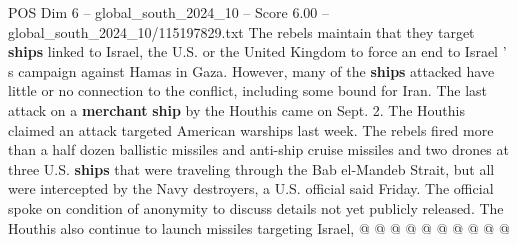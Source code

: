 \begin{textsample}{POS Dim 6 – global\_south\_2024\_10 – Score 6.00 – global\_south\_2024\_10/115197829.txt}
The rebels maintain that they target \textbf{ships} linked to Israel, the U.S. or the United Kingdom to force an end to Israel ' s campaign against Hamas in Gaza.
However, many of the \textbf{ships} attacked have little or no connection to the conflict, including some bound for Iran.
The last attack on a \textbf{merchant} \textbf{ship} by the Houthis came on Sept. 2.
The Houthis claimed an attack targeted American warships last week.
The rebels fired more than a half dozen ballistic missiles and anti-ship cruise missiles and two drones at three U.S. \textbf{ships} that were traveling through the Bab el-Mandeb Strait, but all were intercepted by the Navy destroyers, a U.S. official said Friday.
The official spoke on condition of anonymity to discuss details not yet publicly released.
The Houthis also continue to launch missiles targeting Israel, @ @ @ @ @ @ @ @ @ @

\end{textsample}
